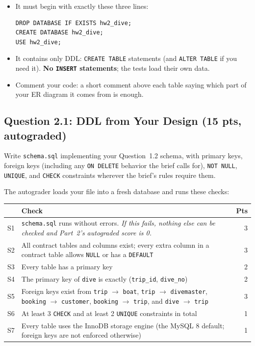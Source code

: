 \documentclass[11pt]{article}
\newcommand{\code}[1]{\texttt{#1}}
\begin{document}
\begin{itemize}
  \item It must begin with exactly these three lines:
\begin{lstlisting}
DROP DATABASE IF EXISTS hw2_dive;
CREATE DATABASE hw2_dive;
USE hw2_dive;
\end{lstlisting}
  \item It contains only DDL: \code{CREATE TABLE} statements (and \code{ALTER TABLE} if you need it).
    \textbf{No \code{INSERT} statements}; the tests load their own data.
  \item Comment your code: a short comment above each table saying which part of your ER diagram it
    comes from is enough.
\end{itemize}

\subsection*{Question 2.1: DDL from Your Design \hfill\textbf{(15 pts, autograded)}}

Write \code{schema.sql} implementing your Question~1.2 schema, with primary keys, foreign keys
(including any \code{ON DELETE} behavior the brief calls for), \code{NOT NULL}, \code{UNIQUE}, and
\code{CHECK} constraints wherever the brief's rules require them.

The autograder loads your file into a fresh database and runs these checks:

\begin{center}
\renewcommand{\arraystretch}{1.15}
\begin{tabularx}{\linewidth}{@{}l>{\raggedright\arraybackslash}Xr@{}}
\toprule
& \textbf{Check} & \textbf{Pts} \\
\midrule
S1 & \code{schema.sql} runs without errors. \emph{If this fails, nothing else can be checked and Part~2's autograded score is 0.} & 3 \\
S2 & All contract tables and columns exist; every extra column in a contract table allows \code{NULL} or has a \code{DEFAULT} & 3 \\
S3 & Every table has a primary key & 2 \\
S4 & The primary key of \code{dive} is exactly (\code{trip\_id}, \code{dive\_no}) & 2 \\
S5 & Foreign keys exist from \code{trip} $\rightarrow$ \code{boat}, \code{trip} $\rightarrow$ \code{divemaster}, \code{booking} $\rightarrow$ \code{customer}, \code{booking} $\rightarrow$ \code{trip}, and \code{dive} $\rightarrow$ \code{trip} & 3 \\
S6 & At least 3 \code{CHECK} and at least 2 \code{UNIQUE} constraints in total & 1 \\
S7 & Every table uses the InnoDB storage engine (the MySQL 8 default; foreign keys are not enforced otherwise) & 1 \\
\bottomrule
\end{tabularx}
\end{center}
\end{document}
